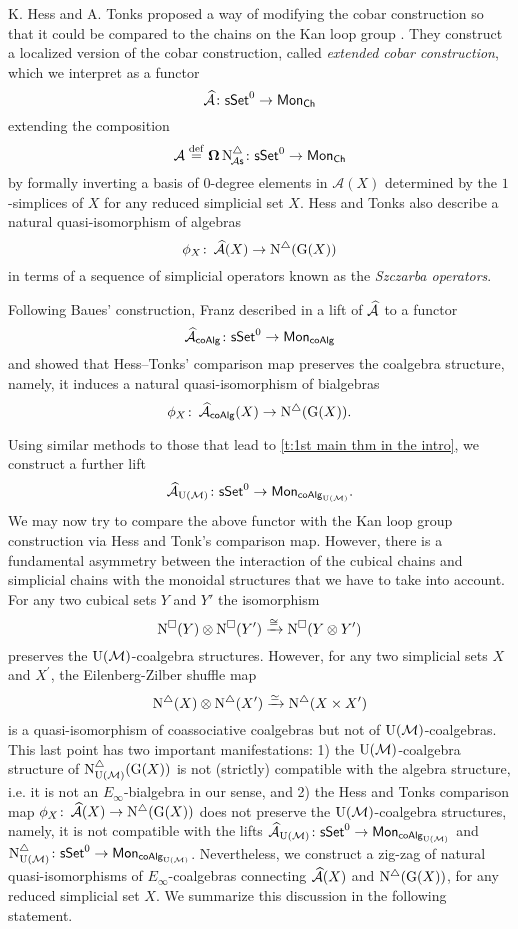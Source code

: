 K. Hess and A. Tonks proposed a way of modifying the cobar construction so that it could be compared to the chains on the Kan loop group \cite{hess2010cobar}.
They construct a localized version of the cobar construction, called \textit{extended cobar construction}, which we interpret as a functor
\[
\operatorname{\mathcal{\widehat{A}}} \colon \mathsf{sSet}^0 \to \mathsf{Mon}_{\mathsf{Ch}}
\]
extending the composition
\[
\operatorname{\mathcal{A}} \stackrel{\mathrm{def}}{=} \operatorname{\mathbf{\Omega}} \operatorname{N^{\triangle}_{\!{\mathcal{A}\mathsf{s}}}} \colon \mathsf{sSet}^0 \to \mathsf{Mon}_{\mathsf{Ch}}
\]
by formally inverting a basis of $0$-degree elements in $\mathcal{A}(X)$ determined by the $1$-simplices of $X$ for any reduced simplicial set $X$.
Hess and Tonks also describe a natural quasi-isomorphism of algebras
\[
\phi_X \colon \operatorname{\mathcal{\widehat{A}}}(X) \to \operatorname{N^{\triangle}}(\operatorname{G}(X))
\]
in terms of a sequence of simplicial operators known as the \textit{Szczarba operators}.

Following Baues’ construction, Franz described in \cite{franz2020szczarba} a lift of $\operatorname{\mathcal{\widehat{A}}}$ to a functor
\[
\operatorname{\mathcal{\widehat{A}}}_{\mathsf{coAlg}} \colon \mathsf{sSet}^0 \to \mathsf{Mon}_{\mathsf{coAlg}}
\]
and showed that Hess--Tonks' comparison map preserves the coalgebra structure, namely, it induces a natural quasi-isomorphism of bialgebras
\[
\phi_X \colon \operatorname{\mathcal{\widehat{A}}}_{\mathsf{coAlg}}(X) \to \operatorname{N^{\triangle}} (\operatorname{G}(X)).
\]

Using similar methods to those that lead to \cref{t:1st main thm in the intro}, we construct a further lift
\[
\operatorname{\mathcal{\widehat{A}}}_{\operatorname{U}(\mathcal{M})} \colon \mathsf{sSet}^0 \to \mathsf{Mon}_{\mathsf{coAlg}_{\operatorname{U}(\mathcal{M})}}.
\]
We may now try to compare the above functor with the Kan loop group construction via Hess and Tonk's comparison map.
However, there is a fundamental asymmetry between the interaction of the cubical chains and simplicial chains with the monoidal structures that we have to take into account.
For any two cubical sets $Y$ and $Y'$ the isomorphism
\[
\operatorname{N^{\square}}(Y) \otimes \operatorname{N^{\square}}(Y') \xrightarrow{\cong} \operatorname{N^{\square}}(Y \otimes Y')
\]
preserves the ${\operatorname{U}(\mathcal{M})}$-coalgebra structures.
However, for any two simplicial sets $X$ and $X^\prime$, the Eilenberg-Zilber shuffle map
\[
\operatorname{N^{\triangle}}(X) \otimes \operatorname{N^{\triangle}}(X^\prime) \xrightarrow{\simeq} \operatorname{N^{\triangle}}(X \times X^\prime)
\]
is a quasi-isomorphism of coassociative coalgebras but not of ${\operatorname{U}(\mathcal{M})}$-coalgebras.
This last point has two important manifestations: 1) the ${\operatorname{U}(\mathcal{M})}$-coalgebra structure of $\operatorname{N^{\triangle}_{{\operatorname{U}(\mathcal{M})}}}(\operatorname{G}(X))$ is not (strictly) compatible with the algebra structure, i.e. it is not an $E_{\infty}$-bialgebra in our sense, and 2) the Hess and Tonks comparison map $\phi_X \colon \operatorname{\mathcal{\widehat{A}}}(X) \to \operatorname{N^{\triangle}}(\operatorname{G}(X))$ does not preserve the ${\operatorname{U}(\mathcal{M})}$-coalgebra structures, namely, it is not compatible with the lifts $\operatorname{\mathcal{\widehat{A}}}_{\operatorname{U}(\mathcal{M})} \colon \mathsf{sSet}^0 \to \mathsf{Mon}_{\mathsf{coAlg}_{\operatorname{U}(\mathcal{M})}}$
and $\operatorname{N^{\triangle}_{{\operatorname{U}(\mathcal{M})}}} \colon \mathsf{sSet}^0 \to \mathsf{Mon}_{\mathsf{coAlg}_{\operatorname{U}(\mathcal{M})}}$.
Nevertheless, we construct a zig-zag of natural quasi-isomorphisms of $E_{\infty}$-coalgebras connecting $\operatorname{\mathcal{\widehat{A}}}(X)$ and $\operatorname{N^{\triangle}}(\operatorname{G}(X))$, for any reduced simplicial set $X$.
We summarize this discussion in the following statement.

